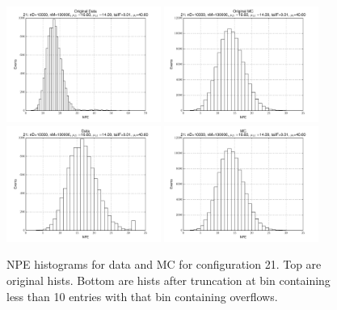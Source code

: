  \begin{figure}[htbp] \begin{center} 
\includegraphics[width=0.45\textwidth]{../FIGURES/21/FIG_Original_Data.pdf} 
\includegraphics[width=0.45\textwidth]{../FIGURES/21/FIG_Original_MC.pdf} 
\includegraphics[width=0.45\textwidth]{../FIGURES/21/FIG_Data.pdf} 
\includegraphics[width=0.45\textwidth]{../FIGURES/21/FIG_MC.pdf} 
\caption{NPE histograms for data and MC for configuration 21. Top are original hists. Bottom are hists after truncation at bin containing less than 10 entries with that bin containing overflows.} 
\label{tab:npe_21} 
\end{center} \end{figure} 

 